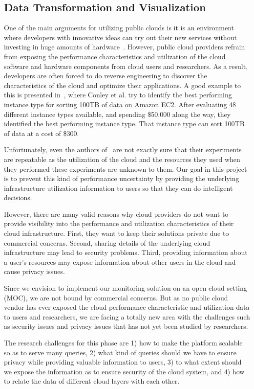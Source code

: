 \subsection{Data Transformation and Visualization} 

One of the main arguments for utilizing public clouds is it is an environment where developers with innovative ideas can try out their new services without investing in huge amounts of hardware~\cite{Armbrust2009}. However, public cloud providers refrain from exposing the performance characteristics and utilization of the cloud software and hardware components from cloud users and researchers. As a result, developers are often forced to do reverse engineering to discover the characteristics of the cloud and optimize their applications. A good example to this is presented in~\cite{conley2015achieving}, where Conley et al. try to identify the best performing instance type for sorting 100TB of data on Amazon EC2. After evaluating 48 different instance types available, and spending \$50.000 along the way, they identified the best performing instance type. That instance type can sort 100TB of data at a cost of \$300. 

Unfortunately, even the authors of~\cite{conley2015achieving} are not exactly sure that their experiments are repeatable as the utilization of the cloud and the resources they used when they performed these experiments are unknown to them. Our goal in this project is to prevent this kind of performance uncertainty by providing the underlying infrastructure utilization information to users so that they can do intelligent decisions.          

However, there are many valid reasons why cloud providers do not want to provide visibility into the performance and utilization characteristics of their cloud infrastructure. First, they want to keep their solutions private due to commercial concerns. Second, sharing details of the underlying cloud infrastructure may lead to security problems. Third, providing information about a user's resources may expose information about other users in the cloud and cause privacy issues. 

Since we envision to implement our monitoring solution on an open cloud setting (MOC), we are not bound by commercial concerns. But as no public cloud vendor has ever exposed the cloud performance characteristic and utilization data to users and researchers, we are facing a totally new area with the challenges such as security issues and privacy issues that has not yet been studied by researchers.

The research challenges for this phase are 1) how to make the platform scalable so as to serve many queries, 2) what kind of queries should we have to ensure privacy while providing valuable information to users, 3) to what extent should we expose the information as to ensure security of the cloud system, and 4) how to relate the data of different cloud layers with each other. 

